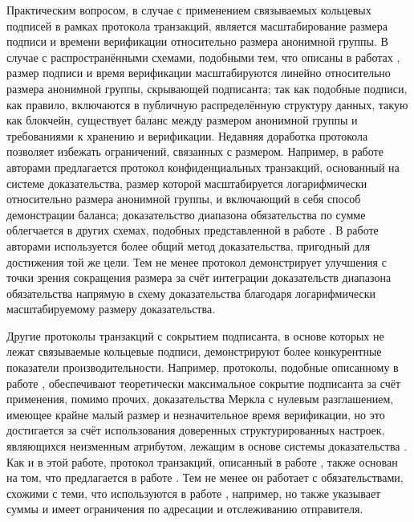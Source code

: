 \documentclass{article}
\theoremstyle{definition}
\begin{document}
Практическим вопросом, в случае с применением связываемых кольцевых подписей в рамках протокола транзакций, является масштабирование размера подписи и времени верификации относительно размера анонимной группы. В случае с распространёнными схемами, подобными тем, что описаны в работах \cite{mlsag,clsag}, размер подписи и время верификации масштабируются линейно относительно размера анонимной группы, скрывающей подписанта; так как подобные подписи, как правило, включаются в публичную распределённую структуру данных, такую как блокчейн, существует баланс между размером анонимной группы и требованиями к хранению и верификации. Недавняя доработка протокола позволяет избежать ограничений, связанных с размером. Например, в работе \cite{rct3} авторами предлагается протокол конфиденциальных транзакций, основанный на системе доказательства, размер которой масштабируется логарифмически относительно размера анонимной группы, и включающий в себя способ демонстрации баланса; доказательство диапазона обязательства по сумме облегчается в других схемах, подобных представленной в работе \cite{bulletproofs}.
В работе \cite{omniring} авторами используется более общий метод доказательства, пригодный для достижения той же цели. Тем не менее протокол демонстрирует улучшения с точки зрения сокращения размера за счёт интеграции доказательств диапазона обязательства напрямую в схему доказательства благодаря логарифмически масштабируемому размеру доказательства.

Другие протоколы транзакций с сокрытием подписанта, в основе которых не лежат связываемые кольцевые подписи, демонстрируют более конкурентные показатели производительности. Например, протоколы, подобные описанному в работе \cite{zcash}, обеспечивают теоретически максимальное сокрытие подписанта за счёт применения, помимо прочих, доказательства Меркла с нулевым разглашением, имеющее крайне малый размер и незначительное время верификации, но это достигается за счёт использования доверенных структурированных настроек, являющихся неизменным атрибутом, лежащим в основе системы доказательства \cite{groth16}.
Как и в этой работе, протокол транзакций, описанный в работе \cite{lelantus}, также основан на том, что предлагается в работе \cite{groth}. Тем не менее он работает с обязательствами, схожими с теми, что используются в работе \cite{zerocoin}, например, но также указывает суммы и имеет ограничения по адресации и отслеживанию отправителя.
\end{document}
